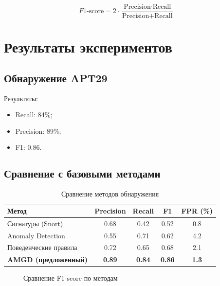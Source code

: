 \begin{equation}
F1\text{-score} = 2 \cdot \frac{\text{Precision} \cdot \text{Recall}}{\text{Precision} + \text{Recall}}
\label{eq:f1}
\end{equation}

\section{Результаты экспериментов}

\subsection{Обнаружение APT29}

Результаты:
\begin{itemize}
    \item Recall: 84\%;
    \item Precision: 89\%;
    \item F1: 0.86.
\end{itemize}
\subsection{Сравнение с базовыми методами}

\begin{table}[h]
\centering
\caption{Сравнение методов обнаружения}
\label{tab:comparison}
\begin{tabular}{lcccc}
\toprule
Метод & Precision & Recall & F1 & FPR (\%) \\
\midrule
Сигнатуры (Snort) & 0.68 & 0.42 & 0.52 & 0.8 \\
Anomaly Detection & 0.55 & 0.71 & 0.62 & 4.2 \\
Поведенческие правила & 0.72 & 0.65 & 0.68 & 2.1 \\
\textbf{AMGD (предложенный)} & \textbf{0.89} & \textbf{0.84} & \textbf{0.86} & \textbf{1.3} \\
\bottomrule
\end{tabular}
\end{table}

\begin{figure}[h]
\centering
{}
\caption{Сравнение F1-score по методам}
\label{fig:f1_comparison}
\end{figure}

